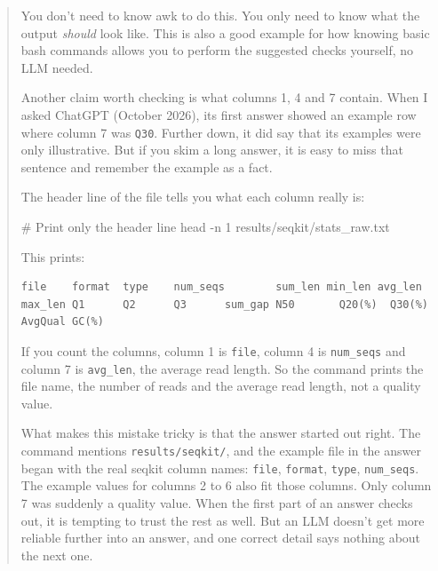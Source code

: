 \documentclass[
  letterpaper,
  DIV=11,
  numbers=noendperiod]{scrreprt}
\newenvironment{Shaded}{}{}
\newcommand{\AttributeTok}[1]{\textcolor[rgb]{0.84,0.23,0.29}{#1}}
\newcommand{\CommentTok}[1]{\textcolor[rgb]{0.42,0.45,0.49}{#1}}
\newcommand{\FunctionTok}[1]{\textcolor[rgb]{0.44,0.26,0.76}{#1}}
\newcommand{\KeywordTok}[1]{\textcolor[rgb]{0.84,0.23,0.29}{#1}}
\newcommand{\NormalTok}[1]{\textcolor[rgb]{0.14,0.16,0.18}{#1}}
\newcommand{\StringTok}[1]{\textcolor[rgb]{0.01,0.18,0.38}{#1}}
\begin{document}
\begin{tcolorbox}
\begin{quote}
\begin{Shaded}
\end{Shaded}

You don't need to know awk to do this. You only need to know what the
output \emph{should} look like. This is also a good example for how
knowing basic bash commands allows you to perform the suggested checks
yourself, no LLM needed.

Another claim worth checking is what columns 1, 4 and 7 contain. When I
asked ChatGPT (October 2026), its first answer showed an example row
where column 7 was \texttt{Q30}. Further down, it did say that its
examples were only illustrative. But if you skim a long answer, it is
easy to miss that sentence and remember the example as a fact.

The header line of the file tells you what each column really is:

\begin{Shaded}
\begin{Highlighting}[]
\CommentTok{\# Print only the header line}
\FunctionTok{head} \AttributeTok{{-}n}\NormalTok{ 1 results/seqkit/stats\_raw.txt}
\end{Highlighting}
\end{Shaded}

This prints:

\begin{verbatim}
file    format  type    num_seqs        sum_len min_len avg_len max_len Q1      Q2      Q3      sum_gap N50       Q20(%)  Q30(%)  AvgQual GC(%)
\end{verbatim}

If you count the columns, column 1 is \texttt{file}, column 4 is
\texttt{num\_seqs} and column 7 is \texttt{avg\_len}, the average read
length. So the command prints the file name, the number of reads and the
average read length, not a quality value.

What makes this mistake tricky is that the answer started out right. The
command mentions \texttt{results/seqkit/}, and the example file in the
answer began with the real seqkit column names: \texttt{file},
\texttt{format}, \texttt{type}, \texttt{num\_seqs}. The example values
for columns 2 to 6 also fit those columns. Only column 7 was suddenly a
quality value. When the first part of an answer checks out, it is
tempting to trust the rest as well. But an LLM doesn't get more reliable
further into an answer, and one correct detail says nothing about the
next one.


\end{quote}
\end{tcolorbox}
\end{document}
